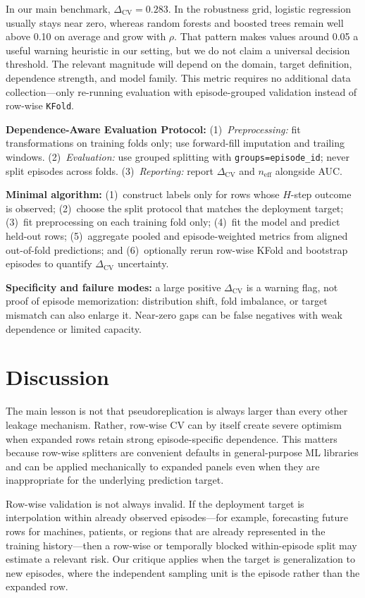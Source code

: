 \documentclass[runningheads]{llncs}
\newcommand{\1}{\mathbf{1}}
\newcommand{\DeltaCV}{\Delta_{\text{CV}}}
\begin{document}
In our main benchmark, $\DeltaCV = 0.283$. In the robustness grid, logistic regression usually stays near zero, whereas random forests and boosted trees remain well above 0.10 on average and grow with $\rho$. That pattern makes values around 0.05 a useful warning heuristic in our setting, but we do not claim a universal decision threshold. The relevant magnitude will depend on the domain, target definition, dependence strength, and model family. This metric requires no additional data collection---only re-running evaluation with episode-grouped validation instead of row-wise \texttt{KFold}.

\textbf{Dependence-Aware Evaluation Protocol:} (1)~\textit{Preprocessing:} fit transformations on training folds only; use forward-fill imputation and trailing windows. (2)~\textit{Evaluation:} use grouped splitting with \texttt{groups=episode\_id}; never split episodes across folds. (3)~\textit{Reporting:} report $\DeltaCV$ and $n_{\text{eff}}$ alongside AUC.

\textbf{Minimal algorithm:} (1)~construct labels only for rows whose $H$-step outcome is observed; (2)~choose the split protocol that matches the deployment target; (3)~fit preprocessing on each training fold only; (4)~fit the model and predict held-out rows; (5)~aggregate pooled and episode-weighted metrics from aligned out-of-fold predictions; and (6)~optionally rerun row-wise KFold and bootstrap episodes to quantify $\DeltaCV$ uncertainty.

\textbf{Specificity and failure modes:} a large positive $\DeltaCV$ is a warning flag, not proof of episode memorization: distribution shift, fold imbalance, or target mismatch can also enlarge it. Near-zero gaps can be false negatives with weak dependence or limited capacity.

\section{Discussion}\label{sec:discussion}

The main lesson is not that pseudoreplication is always larger than every other leakage mechanism. Rather, row-wise CV can by itself create severe optimism when expanded rows retain strong episode-specific dependence. This matters because row-wise splitters are convenient defaults in general-purpose ML libraries and can be applied mechanically to expanded panels even when they are inappropriate for the underlying prediction target.

Row-wise validation is not always invalid. If the deployment target is interpolation within already observed episodes---for example, forecasting future rows for machines, patients, or regions that are already represented in the training history---then a row-wise or temporally blocked within-episode split may estimate a relevant risk. Our critique applies when the target is generalization to new episodes, where the independent sampling unit is the episode rather than the expanded row.
\end{document}
